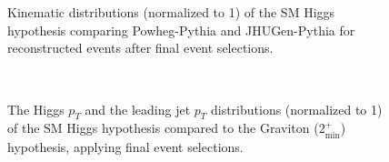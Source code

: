 \begin{figure}[!hbtp]
{}\\
\\
\caption{Kinematic distributions (normalized to 1) of the SM Higgs hypothesis 
comparing Powheg-Pythia and JHUGen-Pythia for reconstructed events 
after final event selections. }
\label{fig:higgskin_0j}
\end{figure}

\begin{figure}[!hbtp]
\centering
{}
\\
\caption{The Higgs $p_T$ and the leading jet $p_T$ distributions (normalized to 1) of the 
SM Higgs hypothesis compared to the Graviton ($2_\text{min}^+$) hypothesis, applying 
final event selections. }
\label{fig:gravvshiggspt_0j}
\end{figure}

